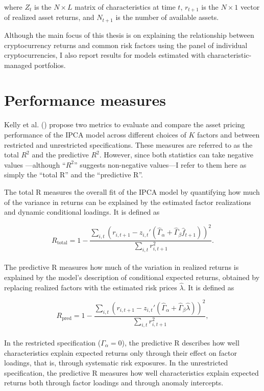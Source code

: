 \documentclass[
  12pt,
  a4paper,
  openany]{scrbook}
\begin{document}
where \(Z_t\) is the \(N \times L\) matrix of characteristics at time
\(t\), \(r_{t+1}\) is the \(N \times 1\) vector of realized asset
returns, and \(N_{t+1}\) is the number of available assets.

Although the main focus of this thesis is on explaining the relationship
between cryptocurrency returns and common risk factors using the panel
of individual cryptocurrencies, I also report results for models
estimated with characteristic-managed portfolios.

\section{Performance measures}\label{performance-measures}

Kelly et al. () propose
two metrics to evaluate and compare the asset pricing performance of the
IPCA model across different choices of \(K\) factors and between
restricted and unrestricted specifications. These measures are referred
to as the total \(R^2\) and the predictive \(R^2\). However, since both
statistics can take negative values ---although ``\(R^2\)'' suggests
non-negative values---I refer to them here as simply the ``total R'' and
the ``predictive R''.

The total R measures the overall fit of the IPCA model by quantifying
how much of the variance in returns can be explained by the estimated
factor realizations and dynamic conditional loadings. It is defined as

\[
R_\text{total} = 1 - 
\frac{\sum_{i,t} \left(r_{i,t+1} - z_{i,t}'(\hat{\Gamma}_\alpha + \hat{\Gamma}_\beta \hat{f}_{t+1})\right)^2}
{\sum_{i,t} r_{i,t+1}^2}.
\]\\
The predictive R measures how much of the variation in realized returns
is explained by the model's description of conditional expected returns,
obtained by replacing realized factors with the estimated risk prices
\(\hat \lambda\). It is defined as

\[
R_\text{pred} = 1 - 
\frac{\sum_{i,t} \left(r_{i,t+1} - z_{i,t}'(\hat{\Gamma}_\alpha + \hat{\Gamma}_\beta \hat{\lambda})\right)^2}
{\sum_{i,t} r_{i,t+1}^2},
\]\\
In the restricted specification (\(\Gamma_\alpha = 0\)), the predictive
R describes how well characteristics explain expected returns only
through their effect on factor loadings, that is, through systematic
risk exposures. In the unrestricted specification, the predictive R
measures how well characteristics explain expected returns both through
factor loadings and through anomaly intercepts.
\end{document}
